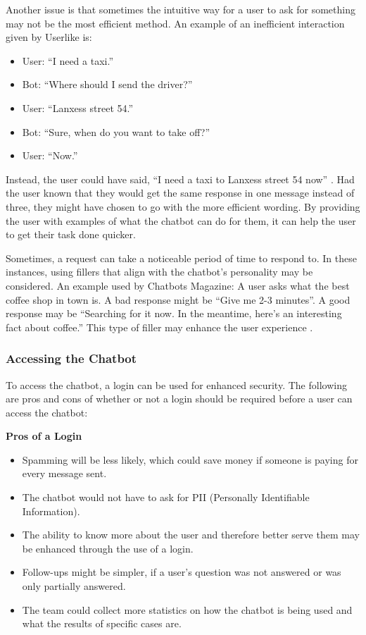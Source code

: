 \documentclass[titlepage, 12pt]{article}
\begin{document}
Another issue is that sometimes the intuitive way for a user to ask for something may not be the most efficient method. An example of an inefficient interaction given by Userlike is:

\begin{itemize}
    \item User: “I need a taxi.”
    \item Bot: “Where should I send the driver?”
    \item User: “Lanxess street 54.”
    \item Bot: “Sure, when do you want to take off?”
    \item User: “Now.”
\end{itemize}

Instead, the user could have said, “I need a taxi to Lanxess street 54 now” \cite{bib-1-12}. Had the user known that they would get the same response in one message instead of three, they might have chosen to go with the more efficient wording. By providing the user with examples of what the chatbot can do for them, it can help the user to get their task done quicker.
 
Sometimes, a request can take a noticeable period of time to respond to. In these instances, using fillers that align with the chatbot’s personality may be considered. An example used by Chatbots Magazine: A user asks what the best coffee shop in town is. A bad response might be “Give me 2-3 minutes”. A good response may be “Searching for it now. In the meantime, here’s an interesting fact about coffee.” This type of filler may enhance the user experience \cite{bib-1-13}.

\subsubsection{Accessing the Chatbot}

To access the chatbot, a login can be used for enhanced security. The following are pros and cons of whether or not a login should be required before a user can access the chatbot:

\textbf{Pros of a Login}

\begin{itemize}
    \item Spamming will be less likely, which could save money if someone is paying for every message sent.
    \item The chatbot would not have to ask for PII (Personally Identifiable Information).
    \item The ability to know more about the user and therefore better serve them may be enhanced through the use of a login.
    \item Follow-ups might be simpler, if a user’s question was not answered or was only partially answered.
    \item The team could collect more statistics on how the chatbot is being used and what the results of specific cases are.
\end{itemize}
\end{document}
